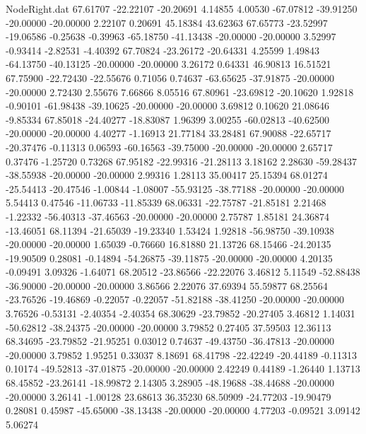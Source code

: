 \begin{filecontents}{NodeRight.dat}
  67.61707  -22.22107  -20.20691     4.14855    4.00530  -67.07812  -39.91250  -20.00000  -20.00000    2.22107    0.20691   45.18384   43.62363
  67.65773  -23.52997  -19.06586    -0.25638   -0.39963  -65.18750  -41.13438  -20.00000  -20.00000    3.52997   -0.93414   -2.82531   -4.40392
  67.70824  -23.26172  -20.64331     4.25599    1.49843  -64.13750  -40.13125  -20.00000  -20.00000    3.26172    0.64331   46.90813   16.51521
  67.75900  -22.72430  -22.55676     0.71056    0.74637  -63.65625  -37.91875  -20.00000  -20.00000    2.72430    2.55676    7.66866    8.05516
  67.80961  -23.69812  -20.10620     1.92818   -0.90101  -61.98438  -39.10625  -20.00000  -20.00000    3.69812    0.10620   21.08646   -9.85334
  67.85018  -24.40277  -18.83087     1.96399    3.00255  -60.02813  -40.62500  -20.00000  -20.00000    4.40277   -1.16913   21.77184   33.28481
  67.90088  -22.65717  -20.37476    -0.11313    0.06593  -60.16563  -39.75000  -20.00000  -20.00000    2.65717    0.37476   -1.25720    0.73268
  67.95182  -22.99316  -21.28113     3.18162    2.28630  -59.28437  -38.55938  -20.00000  -20.00000    2.99316    1.28113   35.00417   25.15394
  68.01274  -25.54413  -20.47546    -1.00844   -1.08007  -55.93125  -38.77188  -20.00000  -20.00000    5.54413    0.47546  -11.06733  -11.85339
  68.06331  -22.75787  -21.85181     2.21468   -1.22332  -56.40313  -37.46563  -20.00000  -20.00000    2.75787    1.85181   24.36874  -13.46051
  68.11394  -21.65039  -19.23340     1.53424    1.92818  -56.98750  -39.10938  -20.00000  -20.00000    1.65039   -0.76660   16.81880   21.13726
  68.15466  -24.20135  -19.90509     0.28081   -0.14894  -54.26875  -39.11875  -20.00000  -20.00000    4.20135   -0.09491    3.09326   -1.64071
  68.20512  -23.86566  -22.22076     3.46812    5.11549  -52.88438  -36.90000  -20.00000  -20.00000    3.86566    2.22076   37.69394   55.59877
  68.25564  -23.76526  -19.46869    -0.22057   -0.22057  -51.82188  -38.41250  -20.00000  -20.00000    3.76526   -0.53131   -2.40354   -2.40354
  68.30629  -23.79852  -20.27405     3.46812    1.14031  -50.62812  -38.24375  -20.00000  -20.00000    3.79852    0.27405   37.59503   12.36113
  68.34695  -23.79852  -21.95251     0.03012    0.74637  -49.43750  -36.47813  -20.00000  -20.00000    3.79852    1.95251    0.33037    8.18691
  68.41798  -22.42249  -20.44189    -0.11313    0.10174  -49.52813  -37.01875  -20.00000  -20.00000    2.42249    0.44189   -1.26440    1.13713
  68.45852  -23.26141  -18.99872     2.14305    3.28905  -48.19688  -38.44688  -20.00000  -20.00000    3.26141   -1.00128   23.68613   36.35230
  68.50909  -24.77203  -19.90479     0.28081    0.45987  -45.65000  -38.13438  -20.00000  -20.00000    4.77203   -0.09521    3.09142    5.06274

\end{filecontents}
